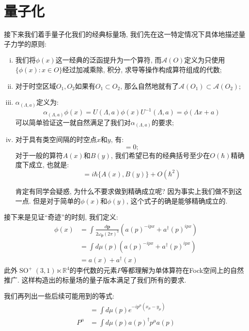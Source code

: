 \section{量子化}
接下来我们着手量子化我们的经典标量场, 我们先在这一特定情况下具体地描述量子力学的原则:
\begin{enumerate}[(i)]
    \item 我们将$\phi(x)$这一经典的泛函提升为一个算符, 而$\mathcal{A}(O)$定义为只使用$\{\phi(x):x\in O\}$经过加减乘除, 积分, 求导等操作构成算符组成的代数;
    \item 对于时空区域$O_1, O_2$如果有$O_1\subset O_2$, 那么自然地就有了$\mathcal{A}(O_1)\subset \mathcal{A}(O_2)$;
    \item $\alpha_{(\Lambda, a)}$定义为:
    \begin{equation}
        \alpha_{(\Lambda, a)}\phi(x)=U(\Lambda, a)\phi(x)U^{-1}(\Lambda, a)=\phi(\Lambda x+a)
    \end{equation}
    可以简单验证这一就自然满足了我们对$\alpha_{(\Lambda, a)}$的要求;
    \item 对于具有类空间隔的时空点$x$和$y$, 有:
    \begin{equation}
        [\phi(x), \phi(y)]=0;
    \end{equation}
    对于一般的算符$A(x)$和$B(y)$, 我们希望已有的经典括号至少在$O(\hbar)$精确度下成立, 也就是:
    \begin{equation}
        [A(x), B(y)]=i\hbar\{A(x),B(y)\}+O(\hbar^2)
    \end{equation}
    \begin{remark}
        肯定有同学会疑惑, 为什么不要求做到精确成立呢? 因为事实上我们做不到这一点. 但是对于简单的$\phi(x)$和$\phi(y)$, 这个式子的确是能够精确成立的.
    \end{remark}
\end{enumerate}\par
接下来是见证``奇迹''的时刻, 我们定义:
\begin{align}
    \phi(x)&=\int \frac{d\mathbf{p}}{2\omega_\mathbf{p}(2\pi)^3}\left(a(p)^{-ipx}+a^\dagger(p)^{ipx}\right)\\
    &=\int d\mu(p)\left(a(p)^{-ipx}+a^\dagger(p)^{ipx}\right)\\
    &=a(x)+a^\dagger(x)
\end{align}
此外$\operatorname{SO}^+(3, 1)\ltimes\mathbb{R}^4$的李代数的元素$P$等都理解为单体算符在Fock空间上的自然推广. 这样构造出的标量场的量子版本满足了我们所有的要求.\par
我们再列出一些后续可能用到的等式:
\begin{align}
    [a(x), a^\dagger(y)]&=\int d\mu(p)e^{-ip^\mu (x_\mu-y_\mu)}\\
    P^\mu&=\int d\mu(p)a(p)^\dagger p^\mu a(p)
\end{align}
\ifx\ALL\undefined

\fi
